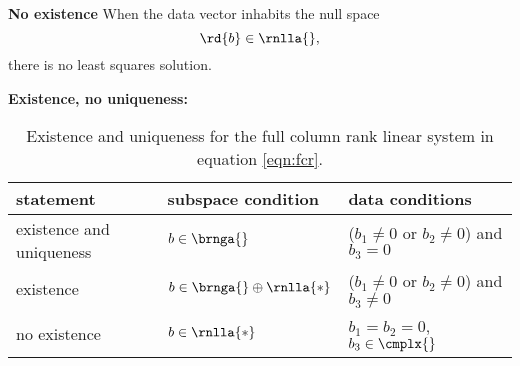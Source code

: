 {\bf{No existence}}
When the data vector inhabits the null space
  \begin{equation*}   %
      \rd{b} \in \rnlla{},
  \end{equation*}
there is no least squares solution. 

{\bf{Existence, no uniqueness:}}

    \begin{table}[t]
    	\caption{Existence and uniqueness for the full column rank linear system in equation \eqref{eqn:fcr}.}
    	\begin{center}
    		\begin{tabular}{lll}
    		  statement & subspace condition & data conditions\\\hline
    		  existence and uniqueness & $b\in\brnga{}$ & ($b_{1}\ne0$ or $b_{2}\ne0$) and $b_{3} = 0 $ \\[3pt]
    		  existence  & $b\in\brnga{} \oplus \rnlla{*} $ &  ($b_{1}\ne0$ or $b_{2}\ne0$) and $b_{3} \ne 0 $ \\[3pt]
    		  no existence & $b\in\rnlla{*}$ & $b_{1} = b_{2} = 0$, $b_{3}\in\cmplx{}$ \\
    		\end{tabular}
    	\end{center}
    	\label{tab:ftola spaces}
    \end{table}%
\endinput